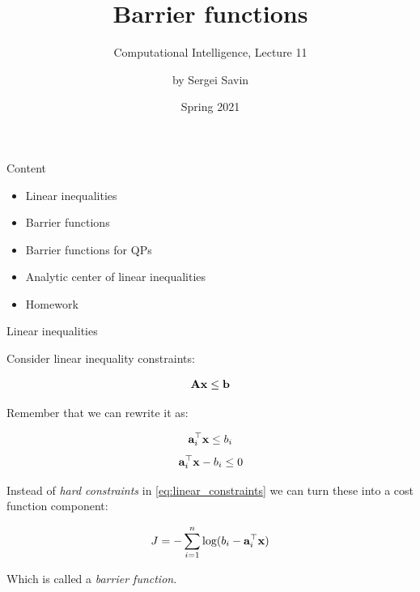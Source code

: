 \documentclass{beamer}
\title{Barrier functions}
\subtitle{Computational Intelligence, Lecture 11}
\author{by Sergei Savin}
\date{Spring 2021}
\begin{document}
\maketitle


\begin{frame}{Content}

\begin{itemize}
\item Linear inequalities
\item Barrier functions
\item Barrier functions for QPs
\item Analytic center of linear inequalities
\item Homework
\end{itemize}

\end{frame}



\begin{frame}{Linear inequalities}
\begin{flushleft}

Consider linear inequality constraints:

\begin{equation}
    \mathbf{A}\mathbf{x} \leq \mathbf{b}
\end{equation}

Remember that we can rewrite it as:

\begin{equation}
    \mathbf{a}_i^\top \mathbf{x} \leq b_i
\end{equation}
\begin{equation}
\label{eq:linear_constraints}
    \mathbf{a}_i^\top \mathbf{x} - b_i \leq 0
\end{equation}

Instead of \emph{hard constraints} in \eqref{eq:linear_constraints} we can turn these into a cost function component:

\begin{equation}
    J = -\sum\limits_{i = 1}^n \text{log} (b_i - \mathbf{a}_i^\top \mathbf{x})
\end{equation}

Which is called a \emph{barrier function}.
 
\end{flushleft}
\end{frame}
\end{document}
